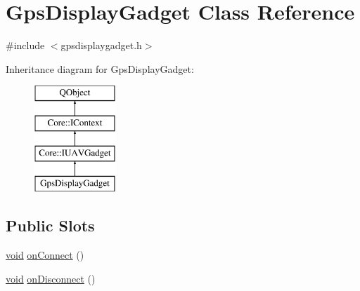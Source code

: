 \hypertarget{class_gps_display_gadget}{\section{Gps\-Display\-Gadget Class Reference}
\label{class_gps_display_gadget}
}


{\ttfamily \#include $<$gpsdisplaygadget.\-h$>$}

Inheritance diagram for Gps\-Display\-Gadget\-:\begin{figure}[H]
\begin{center}
\leavevmode
\includegraphics[height=4.000000cm]{class_gps_display_gadget}
\end{center}
\end{figure}
\subsection*{Public Slots}
\begin{DoxyCompactItemize}
\item 
\hyperlink{group___u_a_v_objects_plugin_ga444cf2ff3f0ecbe028adce838d373f5c}{void} \hyperlink{group___g_p_s_gadget_plugin_ga23030a328c534cd4b1eea152db173655}{on\-Connect} ()
\item 
\hyperlink{group___u_a_v_objects_plugin_ga444cf2ff3f0ecbe028adce838d373f5c}{void} \hyperlink{group___g_p_s_gadget_plugin_ga3f91bba10918be6c7bd99533e61883ac}{on\-Disconnect} ()
\end{DoxyCompactItemize}
